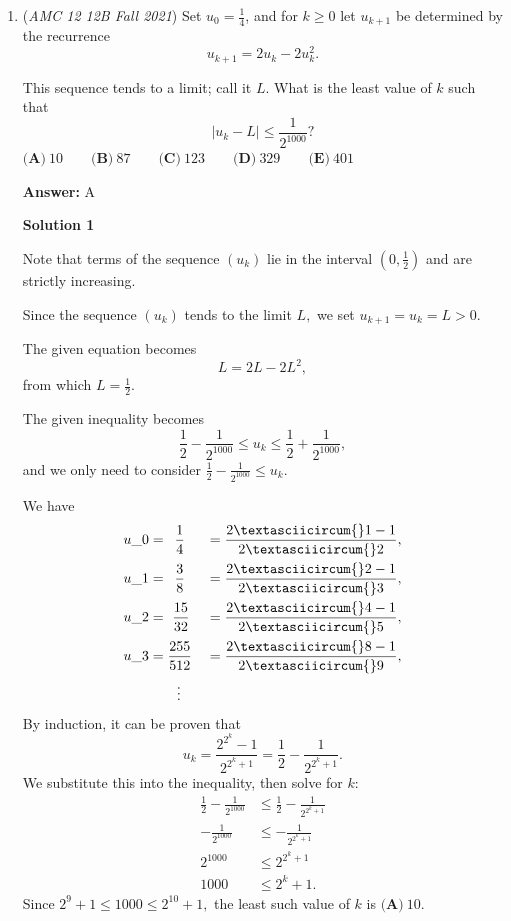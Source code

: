 \begin{enumerate}
	\item (\textit{AMC 12 12B Fall 2021}) Set $u_0 = \frac{1}{4}$, and for $k \ge 0$ let $u_{k+1}$ be determined by the recurrence 
 \[u_{k+1} = 2u_k - 2u_k^2.\]


 This sequence tends to a limit; call it $L$. What is the least value of $k$ such that 
 \[|u_k-L| \le \frac{1}{2^{1000}}?\]
$\textbf{(A)}\: 10\qquad\textbf{(B)}\: 87\qquad\textbf{(C)}\: 123\qquad\textbf{(D)}\: 329\qquad\textbf{(E)}\: 401$

 \textbf{Answer: }A



\textbf{Solution 1}

Note that terms of the sequence $(u_k)$ lie in the interval $\left(0,\frac12\right)$ and are strictly increasing.

 Since the sequence $(u_k)$ tends to the limit $L,$ we set $u_{k+1}=u_k=L>0.$

 The given equation becomes 
 \[L=2L-2L^2,\] from which $L=\frac12.$

 The given inequality becomes 
 \[\frac12-\frac{1}{2^{1000}} \leq u_k \leq \frac12+\frac{1}{2^{1000}},\] and we only need to consider $\frac12-\frac{1}{2^{1000}} \leq u_k.$

 We have
 \begin{alignat*}{8} u\_0 &= \phantom{1}\frac14 &&= \frac{2\textasciicircum{}1-1}{2\textasciicircum{}2}, \\ u\_1 &= \phantom{1}\frac38 &&= \frac{2\textasciicircum{}2-1}{2\textasciicircum{}3}, \\ u\_2 &= \ \frac{15}{32} &&= \frac{2\textasciicircum{}4-1}{2\textasciicircum{}5}, \\ u\_3 &= \frac{255}{512} &&= \frac{2\textasciicircum{}8-1}{2\textasciicircum{}9}, \\ & \phantom{1111} \vdots \end{alignat*}By induction, it can be proven that 
 \[u_k=\frac{2^{2^k}-1}{2^{2^k+1}}=\frac12-\frac{1}{2^{2^k+1}}.\]We substitute this into the inequality, then solve for $k:$
 \begin{align*} \frac12-\frac{1}{2^{1000}} &\leq \frac12-\frac{1}{2^{2^k+1}} \\ -\frac{1}{2^{1000}} &\leq -\frac{1}{2^{2^k+1}} \\ 2^{1000} &\leq 2^{2^k+1} \\ 1000 &\leq 2^k+1. \end{align*}
Since $2^9+1 \leq 1000 \leq 2^{10}+1,$ the least such value of $k$ is $\boxed{\textbf{(A)}\: 10}.$





\end{enumerate}
